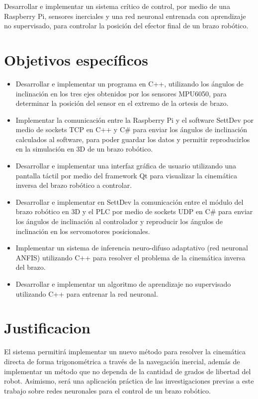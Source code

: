 \documentclass[12pt, twoside]{report}
\begin{document}
Desarrollar e implementar un sistema crítico de control, por medio de una Raspberry Pi, sensores inerciales y una red neuronal entrenada con aprendizaje no supervisado, para controlar la posición del efector final de un brazo robótico.

\newpage
\section{Objetivos específicos}
\begin{itemize}
	
\item Desarrollar e implementar un programa en C++, utilizando los ángulos de inclinación en los tres ejes obtenidos por los sensores MPU6050, para determinar la posición del sensor en el extremo de la ortesis de brazo.

\item Implementar la comunicación entre la Raspberry Pi y el software SettDev por medio de sockets TCP en C++ y C\# para enviar los ángulos de inclinación calculados al software, para poder guardar los datos y permitir reproducirlos en la simulación en 3D de un brazo robótico.

\item Desarrollar e implementar una interfaz gráfica de usuario utilizando una pantalla táctil por medio del framework Qt para visualizar la cinemática inversa del brazo robótico a controlar.

\item Desarrollar e implementar en SettDev la comunicación entre el módulo del brazo robótico en 3D y el PLC por medio de sockets UDP en C\# para enviar los ángulos de inclinación al controlador y reproducir los ángulos de inclinación en los servomotores posicionales.

\item Implementar un sistema de inferencia neuro-difuso adaptativo (red neuronal ANFIS) utilizando C++ para resolver el problema de la cinemática inversa del brazo.

\item Desarrollar e implementar un algoritmo de aprendizaje no supervisado utilizando C++ para entrenar la red neuronal.

\end{itemize}
\newpage
\section{Justificacion}

El sistema permitirá implementar un nuevo método para resolver la cinemática directa de forma trigonométrica a través de la navegación inercial, además de implementar un método que no dependa de la cantidad de grados de libertad del robot. Asimismo, será una aplicación práctica de las investigaciones previas a este trabajo sobre redes neuronales para el control de un brazo robótico.
\end{document}
